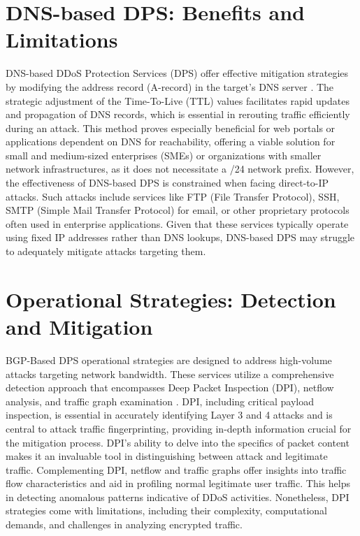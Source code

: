 \section{DNS-based DPS: Benefits and Limitations}\label{sec:DDPS_benefits}
DNS-based DDoS Protection Services (DPS) offer effective mitigation strategies by modifying the address record (A-record) in the target's DNS server \cite{schomp2020akamai}. The strategic adjustment of the Time-To-Live (TTL) values facilitates rapid updates and propagation of DNS records, which is essential in rerouting traffic efficiently during an attack. This method proves especially beneficial for web portals or applications dependent on DNS for reachability, offering a viable solution for small and medium-sized enterprises (SMEs) or organizations with smaller network infrastructures, as it does not necessitate a /24 network prefix. However, the effectiveness of DNS-based DPS is constrained when facing direct-to-IP attacks. Such attacks include services like FTP (File Transfer Protocol), SSH, SMTP (Simple Mail Transfer Protocol) for email, or other proprietary protocols often used in enterprise applications. Given that these services typically operate using fixed IP addresses rather than DNS lookups, DNS-based DPS may struggle to adequately mitigate attacks targeting them.

\section{Operational Strategies: Detection and Mitigation}\label{sec:operations}
BGP-Based DPS operational strategies are designed to address high-volume attacks targeting network bandwidth. These services utilize a comprehensive detection approach that encompasses Deep Packet Inspection (DPI), netflow analysis, and traffic graph examination \cite{wang2018delving} \cite{saied2016detection}. DPI, including critical payload inspection, is essential in accurately identifying Layer 3 and 4 attacks and is central to attack traffic fingerprinting, providing in-depth information crucial for the mitigation process. DPI's ability to delve into the specifics of packet content makes it an invaluable tool in distinguishing between attack and legitimate traffic. Complementing DPI, netflow and traffic graphs offer insights into traffic flow characteristics and aid in profiling normal legitimate user traffic. This helps in detecting anomalous patterns indicative of DDoS activities. Nonetheless, DPI strategies come with limitations, including their complexity, computational demands, and challenges in analyzing encrypted traffic.


